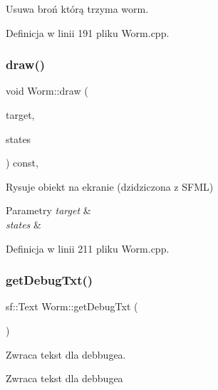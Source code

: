 Usuwa broń którą trzyma worm. 



Definicja w linii 191 pliku Worm.\+cpp.

\mbox{\label{class_worm_adc9fd6dc3b770d4feada327666f31ee3}} 
\subsubsection{\texorpdfstring{draw()}{draw()}}
{\footnotesize\ttfamily void Worm\+::draw (\begin{DoxyParamCaption}\item[{sf\+::\+Render\+Target \&}]{target,  }\item[{sf\+::\+Render\+States}]{states }\end{DoxyParamCaption}) const\hspace{0.3cm}{\ttfamily [override]}, {\ttfamily [protected]}}



Rysuje obiekt na ekranie (dzidziczona z S\+F\+ML) 


\begin{DoxyParams}{Parametry}
{\em target} & \\
\hline
{\em states} & \\
\hline
\end{DoxyParams}


Definicja w linii 211 pliku Worm.\+cpp.

\mbox{\label{class_worm_afed2a8beb878659d49977440293ef884}} 
\subsubsection{\texorpdfstring{get\+Debug\+Txt()}{getDebugTxt()}}
{\footnotesize\ttfamily sf\+::\+Text Worm\+::get\+Debug\+Txt (\begin{DoxyParamCaption}{ }\end{DoxyParamCaption})}



Zwraca tekst dla debbuge\textquotesingle{}a. 

\begin{DoxyReturn}{Zwraca}
tekst dla debbuge\textquotesingle{}a 
\end{DoxyReturn}


